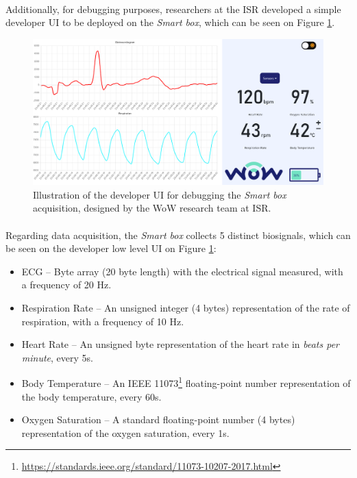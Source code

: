 \paragraph{} Additionally, for debugging purposes, researchers at the \acs{ISR} developed a simple developer \acs{UI} to be deployed on the \textit{Smart box}, which can be seen on Figure \ref{fig:smartbox-gui}.

\begin{figure}[H]
    \centering
    \includegraphics[width=\linewidth]{images/smartbox-gui.png}
    \caption{Illustration of the developer \acs{UI} for debugging the \textit{Smart box} acquisition, designed by the \acs{WoW} research team at \acs{ISR}.}
    \label{fig:smartbox-gui}
\end{figure}

\paragraph{} Regarding data acquisition, the \textit{Smart box} collects 5 distinct biosignals, which can be seen on the developer low level \acs{UI} on Figure \ref{fig:smartbox-gui}:

\label{sec:biosticker_data}

\begin{itemize}
    \item \acf{ECG} -- Byte array (20 byte length) with the electrical signal measured, with a frequency of 20 Hz.
    \item Respiration Rate -- An unsigned integer (4 bytes) representation of the rate of respiration, with a frequency of 10 Hz.
    \item Heart Rate -- An unsigned byte representation of the heart rate in \textit{beats per minute}, every 5s.
    \item Body Temperature -- An IEEE 11073\footnote{\url{https://standards.ieee.org/standard/11073-10207-2017.html}} floating-point number representation of the body temperature, every 60s.
    \item Oxygen Saturation -- A standard floating-point number (4 bytes) representation of the oxygen saturation, every 1s.
\end{itemize}

